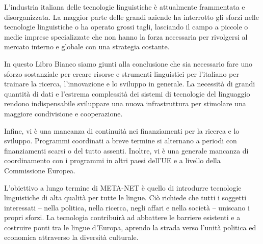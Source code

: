 \begin{multicols}{2}
L'industria italiana delle tecnologie linguistiche \`{e} attualmente
frammentata e disorganizzata. La maggior parte delle grandi aziende ha
interrotto gli sforzi nelle tecnologie linguistiche o ha operato grossi
tagli, lasciando il campo a piccole o medie imprese specializzate che non
hanno la forza necessaria per rivolgersi al mercato interno e globale con una
strategia costante. 

In questo Libro Bianco siamo giunti alla conclusione che sia necessario fare
uno sforzo sostanziale per creare risorse e strumenti linguistici per l'italiano per trainare la
ricerca, l'innovazione e lo sviluppo in generale. La necessit\`{a} di grandi
quantit\`{a} di dati e l'estrema complessit\`{a} dei sistemi di tecnologie del
linguaggio rendono
indispensabile sviluppare una nuova infrastruttura per stimolare una maggiore
condivisione e cooperazione. 

Infine, vi \`{e} una mancanza di continuit\`{a} nei finanziamenti per la
ricerca e lo sviluppo. Programmi coordinati a breve termine si alternano a
periodi con finanziamenti scarsi o del tutto assenti. Inoltre, vi \`{e} una
generale mancanza di coordinamento con i programmi in altri paesi dell'UE e a
livello della Commissione Europea.

L'obiettivo a lungo termine di META-NET \`{e} quello di introdurre tecnologie
linguistiche di alta qualit\`{a} per tutte le lingue. Ci\`{o} richiede
che tutti i soggetti interessati -- nella politica, nella ricerca, negli affari
e nella societ\`{a} -- uniscano i propri sforzi. La tecnologia contribuir\`{a}
ad abbattere le barriere esistenti e a costruire ponti tra le lingue d'Europa,
aprendo la strada verso l'unit\`{a} politica ed economica attraverso la
diversit\`{a} culturale. 
\end{multicols}

\clearpage

